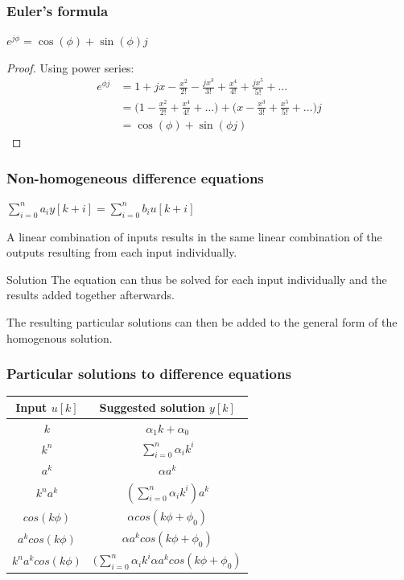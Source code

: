 \begin{frame}
	\frametitle{Euler’s formula}
	\begin{theorem}
		$e^{j\phi} = \cos(\phi) + \sin(\phi)j$
	\end{theorem}
	\begin{proof}
		Using power series:
		\begin{equation*}
				\begin{split}
				e^{\phi j} &= 1 + jx-\frac{x^{2}}{2!} - \frac{jx^{3}}{3!} + \frac{x^{4}}{4!} + \frac{jx^{5}}{5!} + \dots\\
				& = \bigg(1-\frac{x^{2}}{2!}+ \frac{x^{4}}{4!} + \dots\bigg)+\bigg(x - \frac{x^{3}}{3!} + \frac{x^{5}}{5!}+\dots\bigg)j\\
				&= \cos(\phi) + \sin(\phi j)
				\end{split}	
		\end{equation*}
	
	
		
	\end{proof}
\end{frame}
\begin{frame}
	\frametitle{Non-homogeneous difference equations}
	\begin{definition}
		\begin{center}
			$\sum\limits_{i=0}^n a_iy[k+i] = \sum\limits_{i=0}^n b_iu[k+i]$\\
		\end{center}
	 	A linear combination of inputs results in the same linear combination of the outputs resulting from each input individually.
	\end{definition}
	\begin{block}{Solution}
		The equation can thus be solved for each input individually and the results added together afterwards.
			
		The resulting particular solutions can then be added to the general form of the homogenous solution.
	\end{block}
\end{frame}
\begin{frame}
	\frametitle{Particular solutions to difference equations}
	\begin{tabular}{|c|c|}
		\hline Input $u[k]$ & Suggested solution $y[k]$  \\ 
		\hline $k$ & $\alpha_1k+\alpha_0 $\\ 
		\hline $k^{n}$ & $\sum\limits_{i=0}^{n}\alpha_{i}k^{i}$ \\ 
		\hline $a^{k}$&  $\alpha a^{k}$\\ 
		\hline $k^{n}a^{k}$ & $(\sum\limits_{i=0}^{n}\alpha_{i}k^{i})a^{k}$  \\ 
		\hline $cos(k\phi)$ & $\alpha cos(k\phi + \phi_0)$\\ 
		\hline $a^{k}cos(k\phi)$ & $\alpha a^{k} cos(k\phi + \phi_0)$  \\ 
		\hline  $k^{n}a^{k}cos(k\phi)$&  $(\sum\limits_{i=0}^{n}\alpha_{i}k^{i}\alpha a^{k} cos(k\phi + \phi_0)$ \\ 
		\hline 
	\end{tabular} 
\end{frame}
